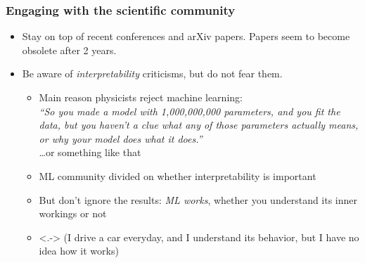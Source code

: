 \begin{frame}
    \frametitle{Engaging with the scientific community}

    \begin{itemize}
        \item<+-> \alert{Stay on top of recent conferences and arXiv papers.}
        Papers seem to become obsolete after 2 years.
        \item<+-> \alert{Be aware of \emph{interpretability} criticisms, but do not fear them.}
        \begin{itemize}[<+->]
            \item Main reason physicists reject machine learning: \\[1ex]

            \emph{``So you made a model with 1,000,000,000 parameters, and you fit the data, but you haven't a clue what any of those parameters actually means, or why your model does what it does.''} \\[1ex]

            \ldots or something like that
            \item ML community divided on whether interpretability is important
            \item But don't ignore the results: \emph{ML works}, whether you understand its inner workings or not
            \item<.-> (I drive a car everyday, and I understand its behavior, but I have no idea how it works)
        \end{itemize}
    \end{itemize}
\end{frame}

